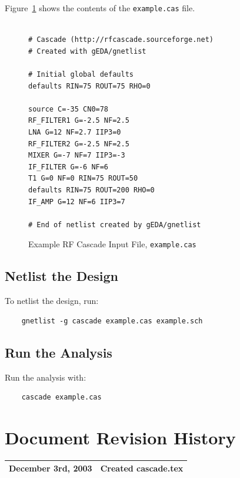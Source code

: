 \documentclass{article}
\begin{document}
Figure~\ref{fig:example.cas} shows
the contents of the {\tt example.cas} file.
\begin{figure}
\begin{verbatim}

# Cascade (http://rfcascade.sourceforge.net)
# Created with gEDA/gnetlist

# Initial global defaults
defaults RIN=75 ROUT=75 RHO=0 

source C=-35 CN0=78 
RF_FILTER1 G=-2.5 NF=2.5 
LNA G=12 NF=2.7 IIP3=0 
RF_FILTER2 G=-2.5 NF=2.5 
MIXER G=-7 NF=7 IIP3=-3 
IF_FILTER G=-6 NF=6 
T1 G=0 NF=0 RIN=75 ROUT=50 
defaults RIN=75 ROUT=200 RHO=0 
IF_AMP G=12 NF=6 IIP3=7 

# End of netlist created by gEDA/gnetlist

\end{verbatim}
\caption{Example RF Cascade Input File, {\tt example.cas}}
\label{fig:example.cas}
\end{figure}

\subsection{Netlist the Design}
To netlist the design, run:
\begin{verbatim}
    gnetlist -g cascade example.cas example.sch
\end{verbatim}

\subsection{Run the Analysis}
Run the analysis with:
\begin{verbatim}
    cascade example.cas
\end{verbatim}
\newpage
\section{Document Revision History}

\begin{table}[h]
\begin{tabular}{|l|l|} \hline
December 3rd, 2003 & Created cascade.tex \\ \hline
\end{tabular}
\end{table}
\end{document}
